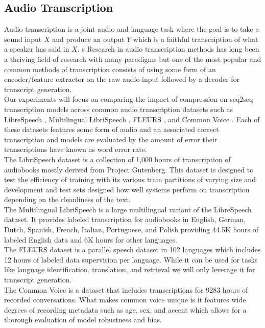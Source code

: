\subsection{Audio Transcription}
Audio transcription is a joint audio and language task where the goal is to take a sound input $X$ and produce an output $Y$ which is a faithful transcription of what a speaker has said in $X$. s Research in audio transcription methods has long been a thriving field of research with many paradigms but one of the most popular and common methods of transcription consists of using some form of an encoder/feature extractor on the raw audio input followed by a decoder for transcript generation. \\
Our experiments will focus on comparing the impact of compression on seq2seq transcription models across common audio transcription datasets such as LibreSpeech \cite{Panayotov2015LibrispeechAA}, Multilingual LibriSpeech \cite{Pratap2020MLSAL}, FLEURS \cite{Conneau2022FLEURSFL}, and Common Voice \cite{Ardila2020CommonVA}. Each of these datasets features some form of audio and an associated correct transcription and models are evaluated by the amount of error their transcriptions have known as word error rate.  \\
The LibriSpeech dataset is a collection of 1,000 hours of transcription of audiobooks mostly derived from Project Gutenberg. This dataset is designed to test the efficiency of training with its various train partitions of varying size and development and test sets designed how well systems perform on transcription depending on the cleanliness of the text.\\
The Multilingual LibriSpeech is a large multilingual variant of the LibreSpeech dataset. It provides labeled transcription for audiobooks in English, German, Dutch, Spanish, French, Italian, Portuguese, and Polish providing 44.5K hours of labeled English data and 6K hours for other languages. \\
The FLEURS dataset is a parallel speech dataset in 102 languages which includes 12 hours of labeled data supervision per language. While it can be used for tasks like language identification, translation, and retrieval we will only leverage it for transcript generation. \\
The Common Voice is a dataset that includes transcriptions for 9283 hours of recorded conversations. What makes common voice unique is it features wide degrees of recording metadata such as age, sex, and accent which allows for a thorough evaluation of model robustness and bias. 
